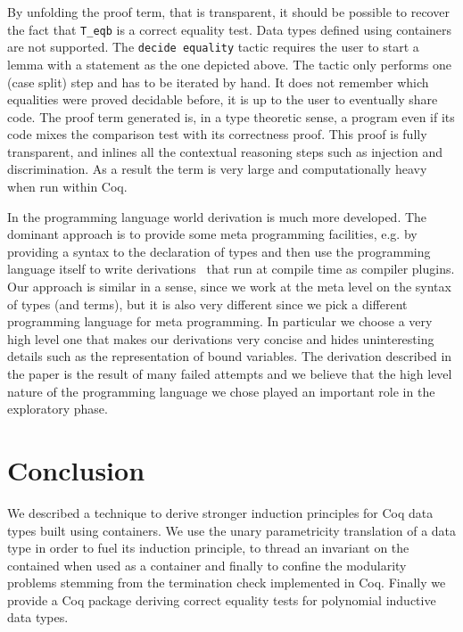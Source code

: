 \documentclass[a4paper,UKenglish,cleveref, autoref]{lipics-v2019}
\begin{document}
\noindent
By unfolding the proof term, that is transparent, it should be
possible to recover the fact that \lstinline+T_eqb+ is a correct
equality test. Data types defined using containers are not supported.
The \lstinline+decide equality+ tactic requires the user to start
a lemma with a statement as the one depicted above.
The tactic only performs one (case split) step and has to
be iterated by hand. It does not remember which equalities were
proved decidable before, it is up to the user to eventually share code.
The proof term generated is, in a type theoretic sense, a program
even if its code mixes the comparison test with its correctness proof.
This proof is fully transparent, and inlines all the contextual
reasoning steps such as injection and discrimination. As a result the
term is very large and computationally heavy when run within Coq.

In the programming language world derivation is much more developed.
The dominant approach is to provide some meta programming facilities,
e.g. by providing a syntax to the declaration of types and then use the
programming language itself to write 
derivations~\cite{Sheard:2002:TMH:636517.636528} that run at compile
time as compiler plugins. 
Our approach is similar in a sense, since we work at the meta level on
the syntax of types (and terms), but it is also very different since
we pick a different programming language for meta programming.  In
particular we choose a very high level one that makes our derivations
very concise and hides uninteresting details such as the
representation of bound variables.
The derivation described in the paper is the result of many failed
attempts and we believe that the high level nature of the programming
language we chose played an important role in the exploratory phase.

\section{Conclusion} %
\label{sec:conclusion}

We described a technique to derive stronger induction principles for Coq data
types built using containers. We use the unary parametricity translation of a
data type in order to fuel its induction principle, to thread an invariant on
the contained when used as a container and finally to confine the modularity
problems stemming from the termination check implemented in Coq.  Finally we
provide a Coq package deriving correct equality tests for polynomial inductive
data types.
\end{document}
